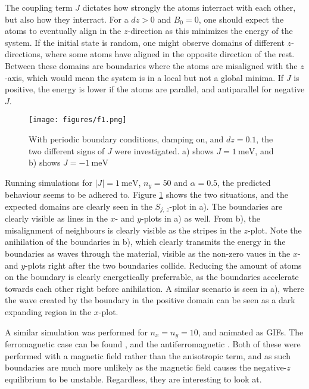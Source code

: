 The coupling term $J$ dictates how strongly the atoms interract with each other, but also how they interract.
For a $dz > 0$ and $B_0 = 0$, one should expect the atoms to eventually align in the $z$-direction as this
minimizes the energy of the system. If the initial state is random, one might observe domains of different $z$-directions,
where some atoms have aligned in the opposite direction of the rest. Between these domains are boundaries
where the atoms are misaligned with the $z$-axis, which would mean the system is in a local but not a global minima. 
If $J$ is positive, the energy is lower if the atoms are parallel, and antiparallel for negative $J$. 

\begin{figure}
    \centering
    \texttt{[image: figures/f1.png]}
    \caption{
        With periodic boundary conditions, damping on, and $dz = 0.1$,
        the two different signs of $J$ were investigated. 
        a) shows $J = \SI{1}{\milli\electronvolt}$, and
        b) shows $J = \SI{-1}{\milli\electronvolt}$
    }
    \label{fig:f}
\end{figure}

Running simulations for $|J| = \SI{1}{\milli\electronvolt}$, $n_y = 50$ and $\alpha = 0.5$, 
the predicted behaviour seems to be adhered to. Figure \ref{fig:f} shows the two situations,
and the expected domains are clearly seen in the $S_{j,\,z}$-plot in a). 
The boundaries are clearly visible as lines in the $x$- and $y$-plots in a) as well.
From b), the misalignment of neighbours is clearly visible as the stripes in the $z$-plot.
Note the anihilation of the boundaries in b), which clearly transmits the energy in the 
boundaries as waves through the material, visible as the non-zero vaues in the $x$- and $y$-plots
right after the two boundaries collide. Reducing the amount of atoms on the boundary is clearly
energetically preferrable, as the boundaries accelerate towards each other right before anihilation.
A similar scenario is seen in a), where the wave created by the boundary in the positive domain
can be seen as a dark expanding region in the $x$-plot. 

A similar simulation was performed for $n_x = n_y = 10$, and animated as GIFs. 
The ferromagnetic case can be found 
\href{https://random.timini.no/viljarjf/ferromagnet.gif}{\color{blue}{here}}, 
and the antiferromagnetic 
\href{https://random.timini.no/viljarjf/antiferromagnet.gif}{\color{blue}{here}}.
Both of these were performed with a magnetic field rather than the anisotropic term, 
and as such boundaries are much more unlikely as the magnetic field causes the 
negative-$z$ equilibrium to be unstable. Regardless, they are interesting to look at.
